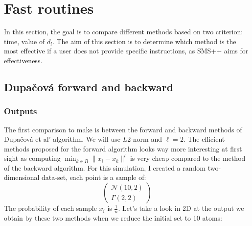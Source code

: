 \documentclass{amsart}
\begin{document}
\section{Fast routines}\label{fast}
In this section, the goal is to compare different methods based on two criterion: time, value of $d_l$. The aim of this section is to determine which method is the most effective if a user does not provide specific instructions, as SMS++ aims for effectiveness.
\subsection{Dupačová forward and backward}
\subsubsection{Outputs}
The first comparison to make is between the forward and backward methods of Dupačová et al' algorithm. We will use $L2$-norm and $\ell=2$. The efficient methods proposed for the forward algorithm looks way more interesting at first sight as computing $\min_{k\in R}\lVert x_i-x_k\rVert^l$ is very cheap compared to the method of the backward algorithm. For this simulation, I created a random two-dimensional data-set, each point is a sample of: $$
\begin{pmatrix}
    \mathcal{N}\left(10,2\right) \\ \Gamma\left(2,2\right)
\end{pmatrix}
$$
The probability of each sample $x_i$ is $\frac{1}{n}$. Let's take a look in 2D at the output we obtain by these two methods when we reduce the initial set to 10 atoms: 
\end{document}
